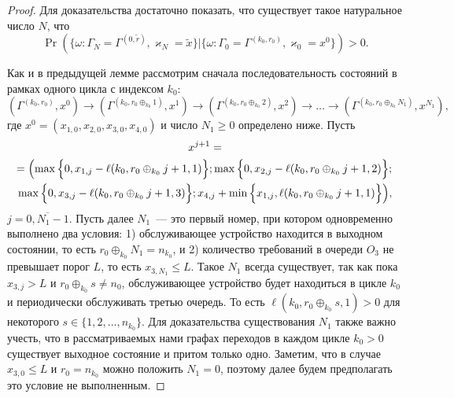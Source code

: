 \begin{proof}
Для доказательства достаточно показать,  что существует такое натуральное число $N$,  что 
\begin{equation*}
\Pr(\{\omega\colon \Gamma_{N}=\Gamma^{(0, \tilde{r} )},  \varkappa_{N}=\tilde{x}\}|\{\omega\colon 
\Gamma_{0}=\Gamma^{(k_0,  r_0)},  \varkappa_{0}=x^0\})>0.
\end{equation*}

Как и в предыдущей лемме рассмотрим сначала последовательность состояний в рамках одного цикла с индексом  $k_0$: 
\begin{equation*}
(\Gamma^{(k_0,  r_0)},  x^0) \rightarrow (\Gamma^{(k_0,  r_0\oplus_{k_0}1)},  x^1) \rightarrow (\Gamma^{(k_0,  r_0\oplus_{k_0}2)},  x^2) \rightarrow \ldots \rightarrow (\Gamma^{(k_0,  r_0\oplus_{k_0}N_1)},  x^{N_1}), 
\end{equation*}
где $x^0=(x_{1, 0},  x_{2, 0},  x_{3, 0},  x_{4, 0})$ и число $N_1 \geqslant 0$ определено ниже. Пусть 
\begin{multline*}
x^{j+1}=\\
=\Bigl(\max{\Bigl\{0,  x_{1, j} - \ell(k_0,  r_0\oplus_{k_0} j+1,  1)\Bigr\}};
\max{\Bigl\{0,  x_{2, j} - \ell(k_0,  r_0\oplus_{k_0} j+1, 2)\Bigr\}};\Bigr.\\
\Bigl.\max{\Bigl\{0,  x_{3, j} - \ell(k_0,  r_0\oplus_{k_0} j+1,  3)\Bigr\}};
x_{4,  j} + \min{\Bigl\{x_{1,  j},  \ell(k_0,  r_0\oplus_{k_0} j+1,  1)\Bigr\}}\Bigr), 
\end{multline*}
$j=\overline{0,  N_1-1}$. Пусть далее $N_1$~--- это первый номер,  при котором одновременно выполнено два условия: 1) обслуживающее устройство находится в выходном состоянии,  то есть $r_0\oplus_{k_0}N_1 = n_{k_0}$,  и 2) количество требований в очереди $O_3$ не превышает порог $L$,  то есть  $x_{3,  N_1}\leqslant L$. Такое $N_1$ всегда существует,  так как пока $x_{3,  j}>L$ и $r_0\oplus_{k_0}s \neq n_0$,  обслуживающее устройство будет находиться в цикле $k_0$ и периодически обслуживать третью очередь. То есть $\ell(k_0,  r_0\oplus_{k_0}s,  1)>0$  для некоторого $s \in \{1,  2,  \ldots,  n_{k_0}\}$. Для доказательства существования $N_1$ также важно учесть,  что в рассматриваемых нами графах переходов в каждом цикле $k_0>0$ существует выходное состояние и притом только одно. Заметим,  что в случае $x_{3,  0} \leqslant L$ и $r_0 = n_{k_0}$ можно положить $N_1 = 0$,  поэтому далее будем предполагать это условие не выполненным.


\end{proof}
